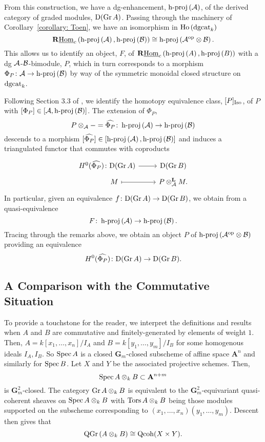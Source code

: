 From this construction, we have a dg-enhancement, \(\operatorname{h-proj}\left(\mathcal{A}\right)\), of the derived category of graded modules, \(\mathrm{D}(\operatorname{Gr}A)\).
Passing through the machinery of Corollary~\ref{corollary: Toen}, we have an isomorphism in \(\operatorname{Ho}\left(\operatorname{dgcat}_k\right)\)
\[\mathbf{R}\underline{\operatorname{Hom}}_c\left(\operatorname{h-proj}\left(\mathcal{A}\right), \operatorname{h-proj}\left(\mathcal{B}\right)\right) \cong \operatorname{h-proj}\left(\mathcal{A}^{\operatorname{op}} \otimes \mathcal{B}\right).\]
This allows us to identify an object, \(F\), of \(\mathbf{R}\underline{\operatorname{Hom}}_c\left(\operatorname{h-proj}\left(A\right), \operatorname{h-proj}\left(B\right)\right)\) with a dg \(\mathcal{A}\)-\(\mathcal{B}\)-bimodule, \(P\), which in turn corresponds to a morphism \(\Phi_P \colon \mathcal{A} \to \operatorname{h-proj}\left(\mathcal{B}\right)\) by way of the symmetric monoidal closed structure on \(\operatorname{dgcat}_k\).

Following Section 3.3 of \textcite{CS15}, we identify the homotopy equivalence class, \([P]_{\operatorname{Iso}}\), of \(P\) with \([\Phi_P] \in [\mathcal{A}, \operatorname{h-proj}\left(\mathcal{B}\right)]\).
The extension of \(\Phi_P\),
\[P \otimes_{\mathcal{A}} - = \widehat{\Phi_P} \colon \operatorname{h-proj}\left(\mathcal{A}\right) \to \operatorname{h-proj}\left(\mathcal{B}\right)\]
descends to a morphism \([\widehat{\Phi_P}] \in [\operatorname{h-proj}\left(\mathcal{A}\right), \operatorname{h-proj}\left(\mathcal{B}\right)]\)
and induces a triangulated functor that commutes with coproducts
\[\begin{tikzcd}[row sep=tiny]
H^0(\widehat{\Phi_P}) \colon \mathrm{D}(\Gr{A}) \arrow{r} & \mathrm{D}(\Gr{B})\\
\quad\quad M \arrow[mapsto]{r} & P \otimes_\A^\mathbf{L} M.
\end{tikzcd}\]
In particular, given an equivalence \(f \colon \mathrm{D}(\operatorname{Gr}A) \to \mathrm{D}(\operatorname{Gr}B)\), we obtain from \textcite{Lunts-Orlov} a quasi-equivalence
\[F \colon \operatorname{h-proj}\left(\mathcal{A}\right) \to \operatorname{h-proj}\left(\mathcal{B}\right).\]
Tracing through the remarks above, we obtain an object \(P\) of \(\operatorname{h-proj}\left(\mathcal{A}^{\operatorname{op}} \otimes \mathcal{B}\right)\) providing an equivalence
\[H^0(\widehat{\Phi_P}) \colon \mathrm{D}(\operatorname{Gr}A) \to \mathrm{D}(\operatorname{Gr}B).\]

\subsection{A Comparison with the Commutative Situation}

To provide a touchstone for the reader, we interpret the definitions and results when \(A\) and \(B\) are commutative and finitely-generated by elements of weight \(1\). Then, \(A = k[x_1,\ldots,x_n]/I_A\) and \(B = k[y_1,\ldots,y_m]/I_B\) for some homogenous ideals \(I_A,I_B\). So \(\operatorname{Spec} A\) is a closed \(\mathbf{G}_m\)-closed subscheme of affine space \(\mathbf{A}^n\) and similarly for \(\operatorname{Spec} B\). Let \(X\) and \(Y\) be the associated projective schemes. Then, 
\begin{displaymath}
  \operatorname{Spec} A \otimes_k B \subset \mathbf{A}^{n+m}
\end{displaymath}
is \(\mathbf{G}_m^2\)-closed. The category \(\operatorname{Gr}A \otimes_k B\) is equivalent to the \(\mathbf{G}_m^2\)-equivariant quasi-coherent sheaves on \(\operatorname{Spec} A \otimes_k B\) with \(\operatorname{Tors}A \otimes_k B\) being those modules supported on the subscheme corresponding to \((x_1,\ldots,x_n)(y_1,\ldots,y_m)\). Descent then gives that 
\begin{displaymath}
  \operatorname{QGr}\left(A \otimes_k B\right) \cong \operatorname{Qcoh}(X \times Y). 
\end{displaymath}
